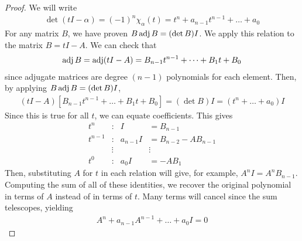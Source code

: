 \begin{proof}
	We will write
	\begin{align*}
		\det(t I - \alpha) = (-1)^n \chi_\alpha(t) = t^n + a_{n-1}t^{n-1} + \dots + a_0
	\end{align*}
	For any matrix $B$, we have proven $B \operatorname{adj} B = (\det B) I$.
	We apply this relation to the matrix $B = tI - A$.
	We can check that
	\begin{align*}
		\operatorname{adj} B = \operatorname{adj}(tI - A) = B_{n-1} t^{n-1} + \dots + B_1 t + B_0
	\end{align*}
	since adjugate matrices are degree $(n-1)$ polynomials for each element.
	Then, by applying $B \operatorname{adj} B = (\det B) I$,
	\begin{align*}
		(tI - A) [ B_{n-1} t^{n-1} + \dots + B_1 t + B_0 ] = (\det B) I = (t^n + \dots + a_0) I
	\end{align*}
	Since this is true for all $t$, we can equate coefficients.
	This gives
	\begin{align*}
		t^n     & :      & I         & = B_{n-1}            \\
		t^{n-1} & :      & a_{n-1} I & = B_{n-2} - AB_{n-1} \\
		        & \vdots &           & \vdots               \\
		t^0     & :      & a_0 I     & = -A B_1
	\end{align*}
	Then, substituting $A$ for $t$ in each relation will give, for example, $A^n I = A^n B_{n-1}$.
	Computing the sum of all of these identities, we recover the original polynomial in terms of $A$ instead of in terms of $t$.
	Many terms will cancel since the sum telescopes, yielding
	\begin{align*}
		A^n + a_{n-1} A^{n-1} + \dots + a_0 I = 0
	\end{align*}
\end{proof}

